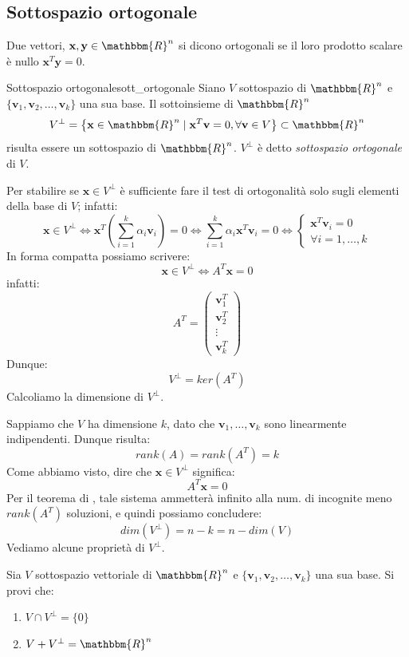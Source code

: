 \documentclass[12pt]{report}
\newcounter{definition}
\newcommand{\namerefl}[1]{%
	\bgroup
	\let\nmu\MakeLowercase
	\nameref{#1}\egroup}
\newcommand{\nmu}{}
\begin{document}
\subsection{Sottospazio ortogonale}
Due vettori, $\mathbf{x}, \mathbf{y} \in \mathbbm{R}^n$ si dicono ortogonali se il loro prodotto scalare è nullo $\mathbf{x}^T\mathbf{y} = 0$.
\begin{definition}{\nmu Sottospazio ortogonale}{sott_ortogonale}
	Siano $V$ sottospazio di $\mathbbm{R}^n$ e $\{\mathbf{v}_1, \mathbf{v}_2, \dots, \mathbf{v}_k\}$ una sua base. Il sottoinsieme di $\mathbbm{R}^n$
	\[
	V^\perp = \left\{\mathbf{x} \in \mathbbm{R}^n \mid \mathbf{x}^T\mathbf{v} = 0, \forall \mathbf{v} \in V\right\} \subset \mathbbm{R}^n
	\]
	risulta essere un sottospazio di $\mathbbm{R}^n$. $V^\perp$ è detto \textit{sottospazio ortogonale} di $V$.
\end{definition}
Per stabilire se $\mathbf{x} \in V^\perp$ è sufficiente fare il test di ortogonalità solo sugli elementi della base di $V$; infatti:
\[
\mathbf{x} \in V^\perp \iff \mathbf{x}^T\left(\displaystyle\sum_{i=1}^{k}\alpha_i\mathbf{v}_i\right) = 0 \iff \displaystyle\sum_{i=1}^{k}\alpha_i\mathbf{x}^T\mathbf{v}_i =0 \iff \begin{cases}
	\mathbf{x}^T\mathbf{v}_i = 0 \\
	\forall i = 1, \dots, k
\end{cases}
\]
In forma compatta possiamo scrivere:
\[
\mathbf{x} \in V^\perp \iff A^T\mathbf{x} = 0
\]
infatti:
\[
A^T = \begin{pmatrix}
	\mathbf{v}_1^T \\
	\mathbf{v}_2^T \\
	\vdots \\
	\mathbf{v}_k^T
\end{pmatrix}
\]
Dunque:
\[
V^\perp = ker\left(A^T\right)
\]
Calcoliamo la dimensione di $V^\perp$.

Sappiamo che $V$ ha dimensione $k$, dato che $\mathbf{v}_1, \dots, \mathbf{v}_k$ sono linearmente indipendenti. Dunque risulta:
\[
rank(A) = rank\left(A^T\right) = k
\]
Come abbiamo visto, dire che $\mathbf{x} \in V^\perp$ significa:
\[
A^T\mathbf{x} = 0
\]
Per il teorema di \namerefl{th:rouche_capelli}, tale sistema ammetterà infinito  alla num. di incognite meno $rank\left(A^T\right)$ soluzioni, e quindi possiamo concludere:
\[
dim\left(V^\perp\right) = n - k = n - dim(V)
\]
Vediamo alcune proprietà di $V^\perp$.

Sia $V$ sottospazio vettoriale di  $\mathbbm{R}^n$ e $\{\mathbf{v}_1, \mathbf{v}_2, \dots, \mathbf{v}_k\}$ una sua base. Si provi che:
\begin{enumerate}
	\item $V \cap V^\perp = \{0\}$
	\item $V + V^\perp = \mathbbm{R}^n$
\end{enumerate}
\end{document}
